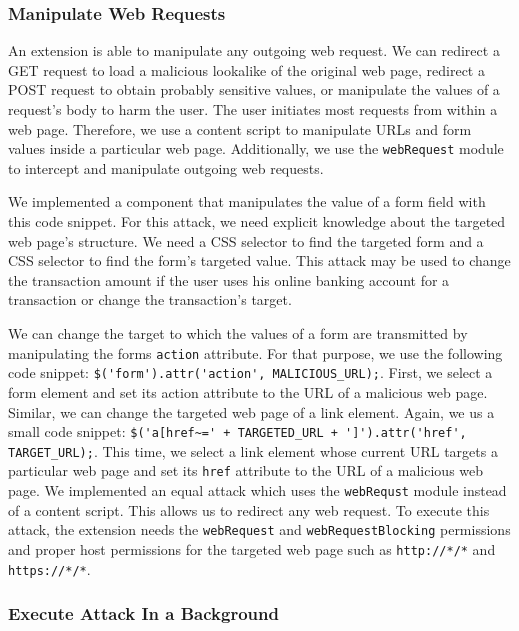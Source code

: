 \subsubsection{Manipulate Web Requests}
\label{sec:manipulateWebRequests}

	An extension is able to manipulate any outgoing web request. We can redirect a GET request to load a malicious lookalike of the original web page, redirect a POST request to obtain probably sensitive values, or manipulate the values of a request's body to harm the user. The user initiates most requests from within a web page. Therefore, we use a content script to manipulate URLs and form values inside a particular web page. Additionally, we use the \texttt{webRequest} module to intercept and manipulate outgoing web requests.
	
	We implemented a component that manipulates the value of a form field with this code snippet. For this attack, we need explicit knowledge about the targeted web page's structure. We need a CSS selector to find the targeted form and a CSS selector to find the form's targeted value. This attack may be used to change the transaction amount if the user uses his online banking account for a transaction or change the transaction's target. 

	We can change the target to which the values of a form are transmitted by manipulating the forms \texttt{action} attribute. For that purpose, we use the following code snippet: \lstinline|$('form').attr('action', MALICIOUS_URL);|. First, we select a form element and set its action attribute to the URL of a malicious web page. Similar, we can change the targeted web page of a link element. Again, we us a small code snippet: \lstinline|$('a[href~=' + TARGETED_URL + ']').attr('href', TARGET_URL);|. This time, we select a link element whose current URL targets a particular web page and set its \texttt{href} attribute to the URL of a malicious web page. We implemented an equal attack which uses the \texttt{webRequst} module instead of a content script. This allows us to redirect any web request. To execute this attack, the extension needs the \texttt{webRequest} and \texttt{webRequestBlocking} permissions and proper host permissions for the targeted web page such as \texttt{http://*/*} and \texttt{https://*/*}. 
	
\subsubsection{Execute Attack In a Background}
\label{sec:executeAttackInBackground}

